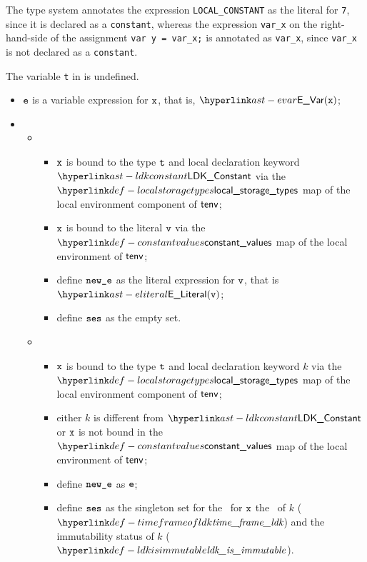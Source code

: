 The type system annotates the expression \verb|LOCAL_CONSTANT| as the literal for \verb|7|,
since it is declared as a \verb|constant|, whereas the expression \verb|var_x|
on the right-hand-side of the assignment \verb|var y = var_x;| is annotated as \verb|var_x|,
since \verb|var_x| is not declared as a \verb|constant|.

The variable \texttt{t} in  is undefined.

\ProseParagraph
\AllApply
\begin{itemize}
  \item $\texttt{e}$ is a variable expression for $\texttt{x}$, that is, $\EVar(\vx)$;
  \item \OneApplies
  \begin{itemize}
    \item {}
    \begin{itemize}
    \item $\texttt{x}$ is bound to the type $\texttt{t}$ and local declaration keyword $\LDKConstant$
          via the $\localstoragetypes$ map of the local environment component of $\textsf{tenv}$;
    \item $\texttt{x}$ is bound to the literal $\texttt{v}$ via the $\constantvalues$ map of the local environment of $\textsf{tenv}$;
    \item define $\texttt{new\_e}$ as the literal expression for $\texttt{v}$, that is $\eliteral{\vv}$;
    \item define $\texttt{ses}$ as the empty set.
    \end{itemize}

    \item {}
    \begin{itemize}
    \item $\texttt{x}$ is bound to the type $\texttt{t}$ and local declaration keyword $k$
          via the \\
          $\localstoragetypes$ map of the local environment component of $\textsf{tenv}$;
    \item either $k$ is different from $\LDKConstant$ or
          $\texttt{x}$ is not bound in the \\
          $\constantvalues$ map of the local environment of $\textsf{tenv}$;
    \item define $\texttt{new\_e}$ as $\texttt{e}$;
    \item define $\texttt{ses}$ as the singleton set for the \ReadLocalTerm\ for $\texttt{x}$ the \timeframeterm\ of
          $k$ ($\timeframeofldk$) and the immutability status of $k$ ($\ldkisimmutable$).
    \end{itemize}


\end{itemize}
\end{itemize}
